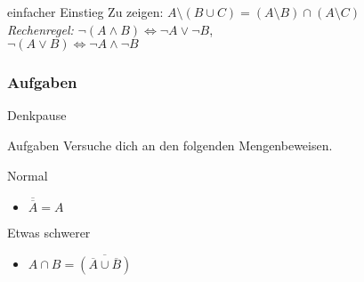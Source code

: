 \documentclass[10pt]{beamer}
\begin{document}
\begin{frame}{einfacher Einstieg}
        \onslide
            Zu zeigen: $A \setminus (B \cup C) = (A \setminus B) \cap (A \setminus C)$
        \\
    \small{\emph{Rechenregel:} $\neg (A \wedge B) \iff \neg A \vee \neg B$, \\ \hspace{1.9cm}$\neg (A \vee B) \iff \neg A \wedge \neg B$}
\end{frame}



\subsubsection{Aufgaben}
{
\begin{frame}[fragile]{Denkpause}
    \begin{alertblock}{Aufgaben}
    Versuche dich an den folgenden Mengenbeweisen.
    \end{alertblock}
    
    \begin{block}{Normal}
        \begin{itemize}
            \item $\overline{\overline{A}} = A$
        \end{itemize}
    \end{block}
    \begin{block}{Etwas schwerer}
        \begin{itemize}
            \item $A\cap B=\overline{(\overline{A}\cup\overline{B})}$
        \end{itemize}
    \end{block}
\end{frame}
}
\end{document}
